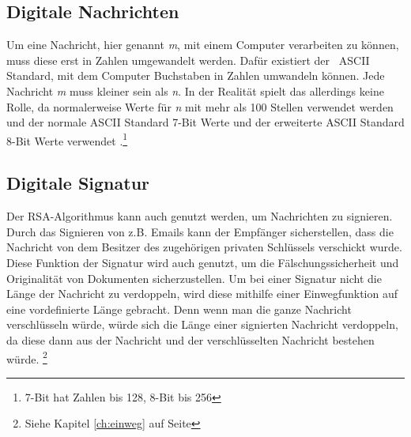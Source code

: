 \documentclass[12pt,a4paper]{scrartcl}
\begin{document}
	\subsection{Digitale Nachrichten}
	\label{chap:digital_text}
Um eine Nachricht, hier genannt \textit{m}, mit einem Computer verarbeiten zu können, muss diese erst in Zahlen umgewandelt werden. Dafür existiert der ~ASCII~ Standard, mit dem Computer Buchstaben in Zahlen umwandeln können. Jede Nachricht \textit{m} muss kleiner sein als \textit{n}. In der Realität spielt das allerdings keine Rolle, da normalerweise Werte für \textit{n} mit mehr als 100 Stellen verwendet werden und der normale ASCII Standard 7-Bit Werte und der erweiterte ASCII Standard 8-Bit Werte verwendet \cite[S.5]{rowland}.\footnote{7-Bit hat Zahlen bis 128, 8-Bit bis 256}
	
	\subsection{Digitale Signatur}
	\label{cha:digital_signature}
	Der RSA-Algorithmus kann auch genutzt werden, um Nachrichten zu signieren. Durch das Signieren von z.B. Emails kann der Empfänger sicherstellen, dass die Nachricht von dem Besitzer des zugehörigen privaten Schlüssels verschickt wurde. Diese Funktion der Signatur wird auch genutzt, um die Fälschungssicherheit und Originalität von  Dokumenten sicherzustellen. Um bei einer Signatur nicht die Länge der Nachricht zu verdoppeln, wird diese mithilfe einer Einwegfunktion auf eine vordefinierte Länge gebracht. Denn wenn man die ganze Nachricht verschlüsseln würde, würde sich die Länge einer signierten Nachricht verdoppeln, da diese dann aus der Nachricht und der verschlüsselten Nachricht bestehen würde. \footnote{Siehe Kapitel \ref{ch:einweg} auf Seite \pageref{ch:einweg}}\\
\end{document}
